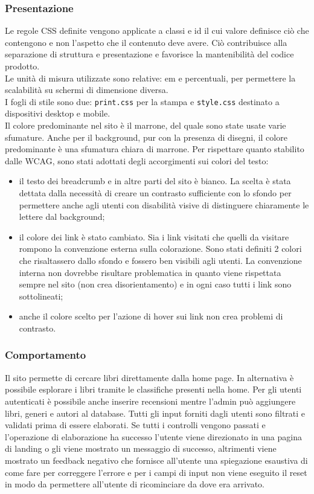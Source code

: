 \documentclass[12pt,a4paper,headings=optiontohead]{article}
\begin{document}
	\subsubsection{Presentazione}
	Le regole CSS definite vengono applicate a classi e id il cui valore definisce ciò che contengono e non l'aspetto che il contenuto deve avere. Ciò contribuisce alla separazione di struttura e presentazione e favorisce la mantenibilità del codice prodotto.\\
	Le unità di misura utilizzate sono relative: em e percentuali, per permettere la scalabilità su schermi di dimensione diversa. \\
	I fogli di stile sono due: \texttt{print.css} per la stampa e \texttt{style.css} destinato a dispositivi desktop e mobile. \\
	Il colore predominante nel sito è il marrone, del quale sono state usate varie sfumature. Anche per il background, pur con la presenza di disegni, il colore predominante è una sfumatura chiara di marrone. Per rispettare quanto stabilito dalle WCAG, sono stati adottati degli accorgimenti sui colori del testo:
	\begin{itemize}
		\item il testo dei breadcrumb e in altre parti del sito è bianco. La scelta è stata dettata dalla necessità di creare un contrasto sufficiente con lo sfondo per permettere anche agli utenti con disabilità visive di distinguere chiaramente le lettere dal background;
		\item il colore dei link è stato cambiato. Sia i link visitati che quelli da visitare rompono la convenzione esterna sulla colorazione. Sono stati definiti 2 colori che risaltassero dallo sfondo e fossero ben visibili agli utenti. La convenzione interna non dovrebbe risultare problematica in quanto viene rispettata sempre nel sito (non crea disorientamento) e in ogni caso tutti i link sono sottolineati;
		\item anche il colore scelto per l'azione di hover sui link non crea problemi di contrasto.
	\end{itemize} 

	\subsubsection{Comportamento}
	Il sito permette di cercare libri direttamente dalla home page. In alternativa è possibile esplorare i libri tramite le classifiche presenti nella home. Per gli utenti autenticati è possibile anche inserire recensioni mentre l'admin può aggiungere libri, generi e autori al database. Tutti gli input forniti dagli utenti sono filtrati e validati prima di essere elaborati. Se tutti i controlli vengono passati e l'operazione di elaborazione ha successo l'utente viene direzionato in una pagina di landing o gli viene mostrato un messaggio di successo, altrimenti viene mostrato un feedback negativo che fornisce all'utente una spiegazione esaustiva di come fare per correggere l'errore e per i campi di input non viene eseguito il reset in modo da permettere all'utente di ricominciare da dove era arrivato.
	
\end{document}
